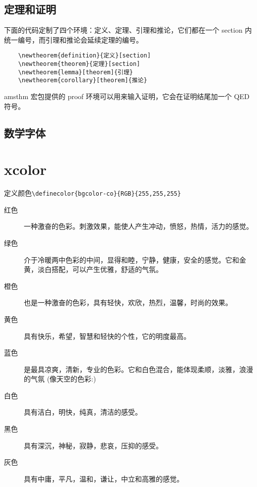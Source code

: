 \documentclass[a4paper]{article}
\begin{document}
\subsection{定理和证明}
  下面的代码定制了四个环境：定义、定理、引理和推论，它们都在一个 section 内统一编号，而引理和推论会延续定理的编号。

    \begin{verbatim}
    \newtheorem{definition}{定义}[section]
    \newtheorem{theorem}{定理}[section]
    \newtheorem{lemma}[theorem]{引理}
    \newtheorem{corollary}[theorem]{推论}
    \end{verbatim}

    amsthm 宏包提供的 proof 环境可以用来输入证明，它会在证明结尾加一个 QED 符号。

\subsection{数学字体}

\section{xcolor}
定义颜色\verb|\definecolor{bgcolor-co}{RGB}{255,255,255}|

    \begin{description}
        \item[红色] 一种激奋的色彩。刺激效果，能使人产生冲动，愤怒，热情，活力的感觉。
        \item[绿色] 介于冷暖两中色彩的中间，显得和睦，宁静，健康，安全的感觉。它和金黄，淡白搭配，可以产生优雅，舒适的气氛。
        \item[橙色] 也是一种激奋的色彩，具有轻快，欢欣，热烈，温馨，时尚的效果。
        \item[黄色] 具有快乐，希望，智慧和轻快的个性，它的明度最高。
        \item[蓝色] 是最具凉爽，清新，专业的色彩。它和白色混合，能体现柔顺，淡雅，浪漫的气氛 (像天空的色彩:)
        \item[白色] 具有洁白，明快，纯真，清洁的感受。
        \item[黑色] 具有深沉，神秘，寂静，悲哀，压抑的感受。
        \item[灰色] 具有中庸，平凡，温和，谦让，中立和高雅的感觉。
    \end{description}

    \newcommand\colorect[2]{\fill[#1](#2)node[above=4pt,right=1pc,black]{#1}rectangle+(1pc,0.618pc);}
\end{document}
